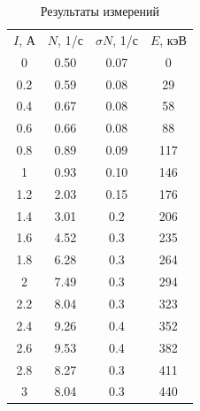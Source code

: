 \documentclass[a4paper, 12pt]{article}
\begin{document}
		\begin{table}[h]
		\centering
		\caption{Результаты измерений}
		\label{table:data}
        \begin{tabular}{c|c|c|c}
        $I$, А               & $N$, 1/с               & $\sigma N$, 1/с          & $E$, кэВ          \\
        0                    & 0.50                   & 0.07                     & 0                 \\
        0.2                  & 0.59                   & 0.08                     & 29                \\
        0.4                  & 0.67                   & 0.08                     & 58                \\
        0.6                  & 0.66                   & 0.08                     & 88                \\
        0.8                  & 0.89                   & 0.09                     & 117               \\
        1                    & 0.93                   & 0.10                     & 146               \\
        1.2                  & 2.03                   & 0.15                     & 176               \\
        1.4                  & 3.01                   & 0.2                      & 206               \\
        1.6                  & 4.52                   & 0.3                      & 235               \\
        1.8                  & 6.28                   & 0.3                      & 264               \\
        2                    & 7.49                   & 0.3                      & 294               \\
        2.2                  & 8.04                   & 0.3                      & 323               \\
        2.4                  & 9.26                   & 0.4                      & 352               \\
        2.6                  & 9.53                   & 0.4                      & 382               \\
        2.8                  & 8.27                   & 0.3                      & 411               \\
        3                    & 8.04                   & 0.3                      & 440               \\

\end{tabular}
\end{table}
\end{document}
